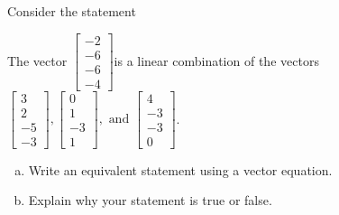 
\begin{exerciseStatement}


Consider the statement 
\begin{center}\begin{minipage}{0.8\textwidth}
 The vector \( \left[\begin{array}{c}
-2 \\
-6 \\
-6 \\
-4
\end{array}\right] \)is a linear combination of the vectors \( \left[\begin{array}{c}
3 \\
2 \\
-5 \\
-3
\end{array}\right] , \left[\begin{array}{c}
0 \\
1 \\
-3 \\
1
\end{array}\right] , \text{ and } \left[\begin{array}{c}
4 \\
-3 \\
-3 \\
0
\end{array}\right] \). 
\end{minipage}\end{center}
    


\begin{enumerate}[(a)]
\item  Write an equivalent statement using a vector equation.
\item  Explain why your statement is true or false.
\end{enumerate}
    
\end{exerciseStatement}
    
